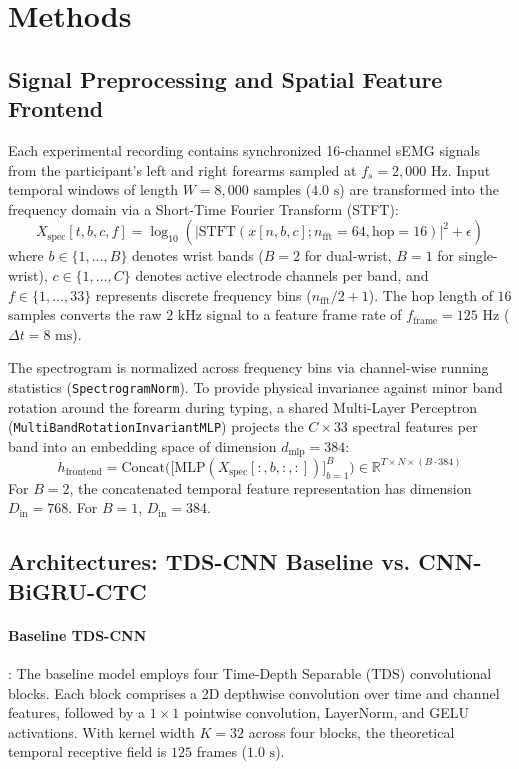 \documentclass{article}
\begin{document}
\section{Methods}
\label{sec:methods}

\subsection{Signal Preprocessing and Spatial Feature Frontend}
Each experimental recording contains synchronized 16-channel sEMG signals from the participant's left and right forearms sampled at $f_s = 2{,}000\text{ Hz}$. Input temporal windows of length $W = 8{,}000$ samples ($4.0\text{ s}$) are transformed into the frequency domain via a Short-Time Fourier Transform (STFT):
\begin{equation}
    X_{\text{spec}}[t, b, c, f] = \log_{10} \left( \left| \text{STFT}(x[n, b, c]; n_{\text{fft}}=64, \text{hop}=16) \right|^2 + \epsilon \right)
\end{equation}
where $b \in \{1, \dots, B\}$ denotes wrist bands ($B=2$ for dual-wrist, $B=1$ for single-wrist), $c \in \{1, \dots, C\}$ denotes active electrode channels per band, and $f \in \{1, \dots, 33\}$ represents discrete frequency bins ($n_{\text{fft}} / 2 + 1$). The hop length of $16$ samples converts the raw $2\text{ kHz}$ signal to a feature frame rate of $f_{\text{frame}} = 125\text{ Hz}$ ($\Delta t = 8\text{ ms}$).

The spectrogram is normalized across frequency bins via channel-wise running statistics (\texttt{SpectrogramNorm}). To provide physical invariance against minor band rotation around the forearm during typing, a shared Multi-Layer Perceptron (\texttt{MultiBandRotationInvariantMLP}) projects the $C \times 33$ spectral features per band into an embedding space of dimension $d_{\text{mlp}} = 384$:
\begin{equation}
    h_{\text{frontend}} = \text{Concat}\Big( \big[ \text{MLP}(X_{\text{spec}}[:, b, :, :]) \big]_{b=1}^B \Big) \in \mathbb{R}^{T \times N \times (B \cdot 384)}
\end{equation}
For $B=2$, the concatenated temporal feature representation has dimension $D_{\text{in}} = 768$. For $B=1$, $D_{\text{in}} = 384$.

\subsection{Architectures: TDS-CNN Baseline vs. CNN-BiGRU-CTC}

\paragraph{Baseline TDS-CNN}:
The baseline model \citep{sivakumar2024emg2qwerty} employs four Time-Depth Separable (TDS) convolutional blocks. Each block comprises a 2D depthwise convolution over time and channel features, followed by a $1\times 1$ pointwise convolution, LayerNorm, and GELU activations. With kernel width $K=32$ across four blocks, the theoretical temporal receptive field is $125$ frames ($1.0\text{ s}$).
\end{document}
